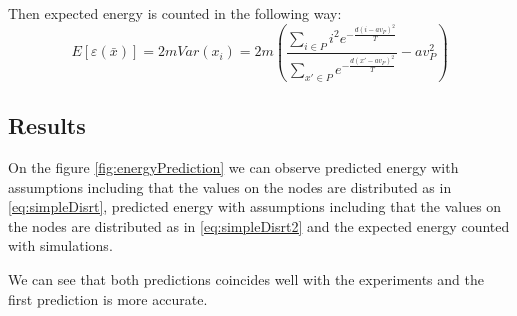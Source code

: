 \documentclass[12pt]{report}
\begin{document}
Then expected energy is counted in the following way:
$$ E[\varepsilon (\bar{x})] = 2mVar(x_i)  = 2m\left(\frac{ \sum\limits_{i\in P} i^2 e^{- \frac{d(i - av_P)^2}{T}} }{ \sum\limits_{x'\in P} e^{-\frac{d(x' - av_P)^2}{T}}} - av_P^2\right)$$


\subsection{Results}

On the figure \ref{fig:energyPrediction} we can observe predicted energy with assumptions including that the values on the nodes are distributed as in \ref{eq:simpleDisrt}, predicted energy with assumptions including that the values on the nodes are distributed as in \ref{eq:simpleDisrt2} and the expected energy counted with simulations.

We can see that both predictions coincides well with the experiments and the first prediction is more accurate.
\end{document}

